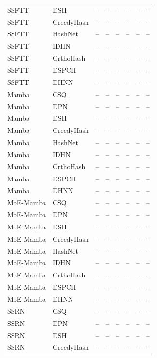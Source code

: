 \begin{longtable}{llrrrrrr}
SSFTT & DSH & -- & -- & -- & -- & -- & -- \\
SSFTT & GreedyHash & -- & -- & -- & -- & -- & -- \\
SSFTT & HashNet & -- & -- & -- & -- & -- & -- \\
SSFTT & IDHN & -- & -- & -- & -- & -- & -- \\
SSFTT & OrthoHash & -- & -- & -- & -- & -- & -- \\
SSFTT & DSPCH & -- & -- & -- & -- & -- & -- \\
SSFTT & DHNN & -- & -- & -- & -- & -- & -- \\
\addlinespace
Mamba & CSQ & -- & -- & -- & -- & -- & -- \\
Mamba & DPN & -- & -- & -- & -- & -- & -- \\
Mamba & DSH & -- & -- & -- & -- & -- & -- \\
Mamba & GreedyHash & -- & -- & -- & -- & -- & -- \\
Mamba & HashNet & -- & -- & -- & -- & -- & -- \\
Mamba & IDHN & -- & -- & -- & -- & -- & -- \\
Mamba & OrthoHash & -- & -- & -- & -- & -- & -- \\
Mamba & DSPCH & -- & -- & -- & -- & -- & -- \\
Mamba & DHNN & -- & -- & -- & -- & -- & -- \\
\addlinespace
MoE-Mamba & CSQ & -- & -- & -- & -- & -- & -- \\
MoE-Mamba & DPN & -- & -- & -- & -- & -- & -- \\
MoE-Mamba & DSH & -- & -- & -- & -- & -- & -- \\
MoE-Mamba & GreedyHash & -- & -- & -- & -- & -- & -- \\
MoE-Mamba & HashNet & -- & -- & -- & -- & -- & -- \\
MoE-Mamba & IDHN & -- & -- & -- & -- & -- & -- \\
MoE-Mamba & OrthoHash & -- & -- & -- & -- & -- & -- \\
MoE-Mamba & DSPCH & -- & -- & -- & -- & -- & -- \\
MoE-Mamba & DHNN & -- & -- & -- & -- & -- & -- \\
\addlinespace
SSRN & CSQ & -- & -- & -- & -- & -- & -- \\
SSRN & DPN & -- & -- & -- & -- & -- & -- \\
SSRN & DSH & -- & -- & -- & -- & -- & -- \\
SSRN & GreedyHash & -- & -- & -- & -- & -- & -- \\

\end{longtable}
